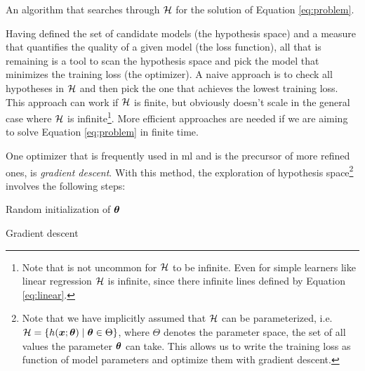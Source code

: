 \begin{definition}[Optimizer]
	An algorithm that searches through $\mathcal{H}$ for the solution of Equation
	\ref{eq:problem}.
\end{definition}

Having defined the set of candidate models (the hypothesis space) and a measure
that quantifies the quality of a given model (the loss function), all that is
remaining is a tool to scan the hypothesis space and pick the model that
minimizes the training loss (the optimizer). A naive approach is to check all
hypotheses in $\mathcal{H}$ and then pick the one that achieves the lowest training
loss. This approach can work if $\mathcal{H}$ is finite, but obviously doesn't scale
in the general case where $\mathcal{H}$ is infinite\footnote{Note that is not
uncommon for $\mathcal{H}$ to be infinite. Even for simple learners like linear
regression $\mathcal{H}$ is infinite, since there infinite lines defined by Equation
\ref{eq:linear}.}. More efficient approaches are needed if we are aiming to solve
Equation \ref{eq:problem} in finite time.

One optimizer that is frequently used in \gls{ml} and is the precursor of more
refined ones, is \emph{gradient descent}. With
this method, the exploration of hypothesis space\footnote{Note that we have
implicitly assumed that $\mathcal{H}$ can be parameterized, i.e. $\mathcal{H} =
\{h(\boldsymbol{x};\boldsymbol{\theta}) \mid \boldsymbol{\theta} \in \Theta\}$, where $\Theta$ denotes the parameter
space, the set of all values the parameter $\boldsymbol{\theta}$ can take. This allows us to
write the training loss as function of model parameters and optimize them with
gradient descent.} involves the following steps:

\begin{algorithm}[H]
	Random initialization of $\boldsymbol{\theta}$\;
	\caption{Gradient descent}
	\label{algo:gd}
\end{algorithm}

